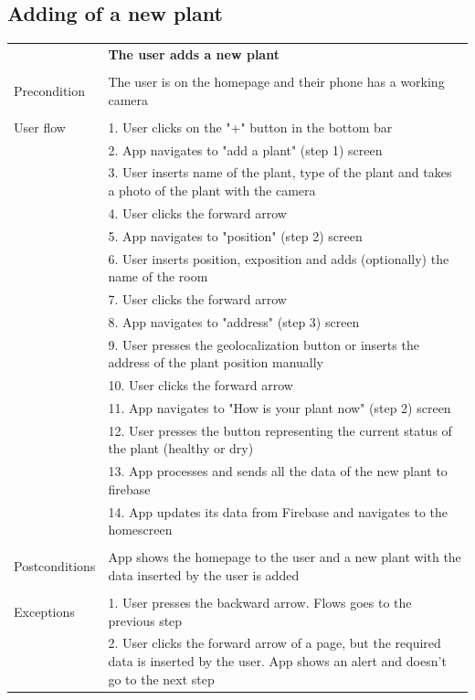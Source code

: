 \documentclass[10pt]{article}
\begin{document}
    \subsection{Adding of a new plant}
    \begin{tabular}{ p{3cm}|p{8cm} }
     & \textbf{The user adds a new plant} \\
     \\
     Precondition & The user is on the homepage and their phone has a working camera \\ 
     \\
     User flow 
     & 1. User clicks on the "+" button in the bottom bar \\
     & 2. App navigates to "add a plant" (step 1) screen\\ 
     & 3. User inserts name of the plant, type of the plant and takes a photo of the plant with the camera  \\
     & 4. User clicks the forward arrow\\
     & 5. App navigates to "position" (step 2) screen \\
     & 6. User inserts position, exposition and adds (optionally) the name of the room \\
     & 7. User clicks the forward arrow \\
     & 8. App navigates to "address" (step 3) screen \\
     & 9. User presses the geolocalization button or inserts the address of the plant position manually \\
     & 10. User clicks the forward arrow \\
     & 11. App navigates to "How is your plant now" (step 2) screen \\
     & 12. User presses the button representing the current status of the plant (healthy or dry) \\
     & 13. App processes and sends all the data of the new plant to firebase \\
     & 14. App updates its data from Firebase and navigates to the homescreen \\
     \\
     Postconditions & App shows the homepage to the user and a new plant with the data inserted by the user is added \\
     \\
     Exceptions 
     & 1. User presses the backward arrow. Flows goes to the previous step\\
     & 2. User clicks the forward arrow of a page, but the required data is inserted by the user. App shows an alert and doesn't go to the next step\\
    \end{tabular}
    \newline
    \newline
    \newline
\end{document}
